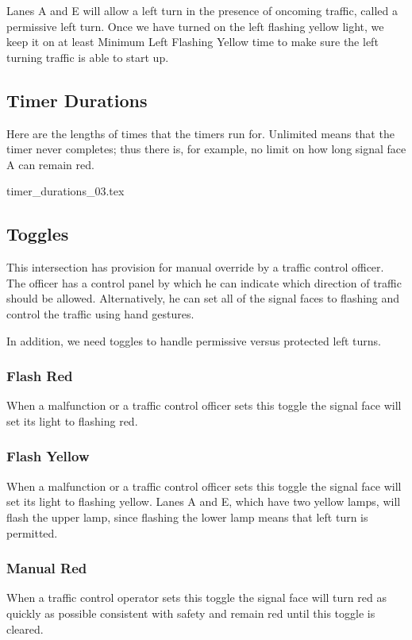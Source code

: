 \documentclass[letterpaper,twoside]{article}
\begin{document}
Lanes A and E will allow a left turn in the presence of oncoming traffic,
called a permissive left turn. Once we have turned on the left flashing
yellow light, we keep it on at least Minimum Left Flashing Yellow time
to make sure the left turning traffic is able to start up.

\subsection{Timer Durations}

Here are the lengths of times that the timers run for.  Unlimited means
that the timer never completes; thus there is, for example, no limit on
how long signal face A can remain red.

 {timer_durations_03.tex}

\subsection{Toggles}

This intersection has provision for manual override by a traffic control
officer.  The officer has a control panel by which he can indicate which
direction of traffic should be allowed.  Alternatively, he can set all
of the signal faces to flashing and control the traffic using hand gestures.

In addition, we need toggles to handle permissive versus protected
left turns.

\subsubsection{Flash Red}
When a malfunction or a traffic control officer sets this toggle
the signal face will set its light to flashing red.

\subsubsection{Flash Yellow}
When a malfunction or a traffic control officer sets this toggle
the signal face will set its light to flashing yellow.
Lanes A and E, which have two yellow lamps, will flash the upper lamp,
since flashing the lower lamp means that left turn is permitted.

\subsubsection{Manual Red}
When a traffic control operator sets this toggle the signal face will
turn red as quickly as possible consistent with safety and remain
red until this toggle is cleared.
\end{document}
